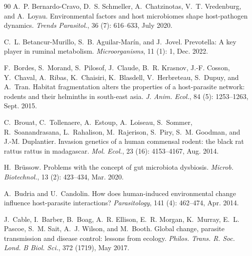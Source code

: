 \documentclass[oneside, a4paper, onecolumn, 11pt]{article}
\begin{document}
\begin{thebibliography}{90}
A.~P. Bernardo-Cravo, D.~S. Schmeller, A.~Chatzinotas, V.~T. Vredenburg, and A.~Loyau.
\newblock Environmental factors and host microbiomes shape host-pathogen dynamics.
\newblock \emph{Trends Parasitol.}, 36 (7): 616--633, July 2020.

C.~L. Betancur-Murillo, S.~B. Aguilar-Marín, and J.~Jovel.
\newblock Prevotella: A key player in ruminal metabolism.
\newblock \emph{Microorganisms}, 11 (1): 1, Dec. 2022.

F.~Bordes, S.~Morand, S.~Pilosof, J.~Claude, B.~R. Krasnov, J.-F. Cosson, Y.~Chaval, A.~Ribas, K.~Chaisiri, K.~Blasdell, V.~Herbreteau, S.~Dupuy, and A.~Tran.
\newblock Habitat fragmentation alters the properties of a host-parasite network: rodents and their helminths in south-east asia.
\newblock \emph{J. Anim. Ecol.}, 84 (5): 1253--1263, Sept. 2015.

C.~Brouat, C.~Tollenaere, A.~Estoup, A.~Loiseau, S.~Sommer, R.~Soanandrasana, L.~Rahalison, M.~Rajerison, S.~Piry, S.~M. Goodman, and J.-M. Duplantier.
\newblock Invasion genetics of a human commensal rodent: the black rat rattus rattus in madagascar.
\newblock \emph{Mol. Ecol.}, 23 (16): 4153--4167, Aug. 2014.

H.~Brüssow.
\newblock Problems with the concept of gut microbiota dysbiosis.
\newblock \emph{Microb. Biotechnol.}, 13 (2): 423--434, Mar. 2020.

A.~Budria and U.~Candolin.
\newblock How does human-induced environmental change influence host-parasite interactions?
\newblock \emph{Parasitology}, 141 (4): 462--474, Apr. 2014.

J.~Cable, I.~Barber, B.~Boag, A.~R. Ellison, E.~R. Morgan, K.~Murray, E.~L. Pascoe, S.~M. Sait, A.~J. Wilson, and M.~Booth.
\newblock Global change, parasite transmission and disease control: lessons from ecology.
\newblock \emph{Philos. Trans. R. Soc. Lond. B Biol. Sci.}, 372 (1719), May 2017.


\end{thebibliography}
\end{document}
